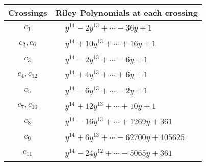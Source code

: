 \documentclass[1p]{elsarticle_modified}
\theoremstyle{definition}
\begin{document}
\begin{tabular}{m{50pt}|m{274pt}}
Crossings & \hspace{64pt}Riley Polynomials at each crossing \\
\hline $$\begin{aligned}c_{1}\end{aligned}$$&$\begin{aligned}
&y^{14}-2 y^{13}+\cdots-36 y+1
\end{aligned}$\\
\hline $$\begin{aligned}c_{2},c_{6}\end{aligned}$$&$\begin{aligned}
&y^{14}+10 y^{13}+\cdots+16 y+1
\end{aligned}$\\
\hline $$\begin{aligned}c_{3}\end{aligned}$$&$\begin{aligned}
&y^{14}-2 y^{13}+\cdots-6 y+1
\end{aligned}$\\
\hline $$\begin{aligned}c_{4},c_{12}\end{aligned}$$&$\begin{aligned}
&y^{14}+4 y^{13}+\cdots+6 y+1
\end{aligned}$\\
\hline $$\begin{aligned}c_{5}\end{aligned}$$&$\begin{aligned}
&y^{14}-6 y^{13}+\cdots-2 y+1
\end{aligned}$\\
\hline $$\begin{aligned}c_{7},c_{10}\end{aligned}$$&$\begin{aligned}
&y^{14}+12 y^{13}+\cdots+10 y+1
\end{aligned}$\\
\hline $$\begin{aligned}c_{8}\end{aligned}$$&$\begin{aligned}
&y^{14}-16 y^{13}+\cdots+1269 y+361
\end{aligned}$\\
\hline $$\begin{aligned}c_{9}\end{aligned}$$&$\begin{aligned}
&y^{14}+6 y^{13}+\cdots-62700 y+105625
\end{aligned}$\\
\hline $$\begin{aligned}c_{11}\end{aligned}$$&$\begin{aligned}
&y^{14}-24 y^{12}+\cdots-5065 y+361
\end{aligned}$\\
\hline
\end{tabular}\\~\\
\end{document}
